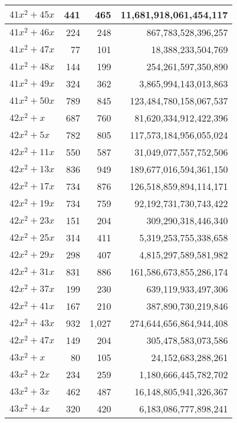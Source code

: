 \documentclass[a4paper]{amsproc}
\theoremstyle{plain}
\theoremstyle{named}
\begin{document}
\begin{longtable}{ | l | r | r | r | }
$41x^2 + 45x$ & 441 & 465 & 11{,}681{,}918{,}061{,}454{,}117 \\ \hline
$41x^2 + 46x$ & 224 & 248 & 867{,}783{,}528{,}396{,}257 \\ \hline
$41x^2 + 47x$ & 77 & 101 & 18{,}388{,}233{,}504{,}769 \\ \hline
$41x^2 + 48x$ & 144 & 199 & 254{,}261{,}597{,}350{,}890 \\ \hline
$41x^2 + 49x$ & 324 & 362 & 3{,}865{,}994{,}143{,}013{,}863 \\ \hline
$41x^2 + 50x$ & 789 & 845 & 123{,}484{,}780{,}158{,}067{,}537 \\ \hline
$42x^2 + x$ & 687 & 760 & 81{,}620{,}334{,}912{,}422{,}396 \\ \hline
$42x^2 + 5x$ & 782 & 805 & 117{,}573{,}184{,}956{,}055{,}024 \\ \hline
$42x^2 + 11x$ & 550 & 587 & 31{,}049{,}077{,}557{,}752{,}506 \\ \hline
$42x^2 + 13x$ & 836 & 949 & 189{,}677{,}016{,}594{,}361{,}150 \\ \hline
$42x^2 + 17x$ & 734 & 876 & 126{,}518{,}859{,}894{,}114{,}171 \\ \hline
$42x^2 + 19x$ & 734 & 759 & 92{,}192{,}731{,}730{,}743{,}422 \\ \hline
$42x^2 + 23x$ & 151 & 204 & 309{,}290{,}318{,}446{,}340 \\ \hline
$42x^2 + 25x$ & 314 & 411 & 5{,}319{,}253{,}755{,}338{,}658 \\ \hline
$42x^2 + 29x$ & 298 & 407 & 4{,}815{,}297{,}589{,}581{,}982 \\ \hline
$42x^2 + 31x$ & 831 & 886 & 161{,}586{,}673{,}855{,}286{,}174 \\ \hline
$42x^2 + 37x$ & 199 & 230 & 639{,}119{,}933{,}497{,}306 \\ \hline
$42x^2 + 41x$ & 167 & 210 & 387{,}890{,}730{,}219{,}846 \\ \hline
$42x^2 + 43x$ & 932 & 1{,}027 & 274{,}644{,}656{,}864{,}944{,}408 \\ \hline
$42x^2 + 47x$ & 149 & 204 & 305{,}478{,}583{,}073{,}586 \\ \hline
$43x^2 + x$ & 80 & 105 & 24{,}152{,}683{,}288{,}261 \\ \hline
$43x^2 + 2x$ & 234 & 259 & 1{,}180{,}666{,}445{,}782{,}702 \\ \hline
$43x^2 + 3x$ & 462 & 487 & 16{,}148{,}805{,}941{,}326{,}367 \\ \hline
$43x^2 + 4x$ & 320 & 420 & 6{,}183{,}086{,}777{,}898{,}241 \\ \hline

\end{longtable}
\end{document}
